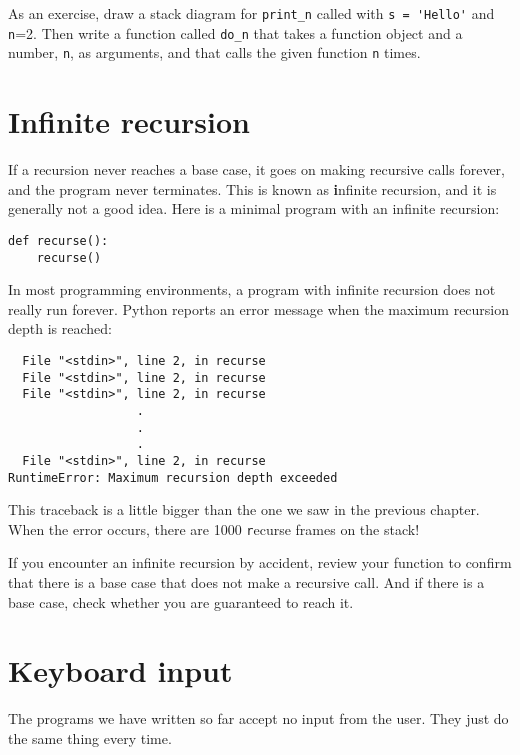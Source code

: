 \documentclass[
DIV=11,
fontsize=13,
twoside,
headinclude=false,
titlepage=firstiscover,
abstract=true,
headsepline=true,
footsepline=true,
chapterprefix=true, %
headings=big,
bibliography=totoc,%
captions=tableheading
]{scrbook}
\theoremstyle{definition}
\begin{document}
As an exercise, draw a stack diagram for \verb"print_n" called with
\verb"s = 'Hello'" and {\texttt n=2}.
Then write a function called \verb"do_n" that takes a function
object and a number, {\texttt n}, as arguments, and that calls
the given function {\texttt n} times.


\section{Infinite recursion}

If a recursion never reaches a base case, it goes on making
recursive calls forever, and the program never terminates.  This is
known as {\textbf infinite recursion}, and it is generally not
a good idea.  Here is a minimal program with an infinite recursion:

\begin{lstlisting}
def recurse():
    recurse()
\end{lstlisting}
%
In most programming environments, a program with infinite recursion
does not really run forever.  Python reports an error
message when the maximum recursion depth is reached:

\begin{lstlisting}
  File "<stdin>", line 2, in recurse
  File "<stdin>", line 2, in recurse
  File "<stdin>", line 2, in recurse
                  .   
                  .
                  .
  File "<stdin>", line 2, in recurse
RuntimeError: Maximum recursion depth exceeded
\end{lstlisting}
%
This traceback is a little bigger than the one we saw in the
previous chapter.  When the error occurs, there are 1000
{\texttt recurse} frames on the stack!

If you encounter an infinite recursion by accident, review
your function to confirm that there is a base case that does not
make a recursive call.  And if there is a base case, check whether
you are guaranteed to reach it.


\section{Keyboard input}

The programs we have written so far accept no input from the user.
They just do the same thing every time.
\end{document}
